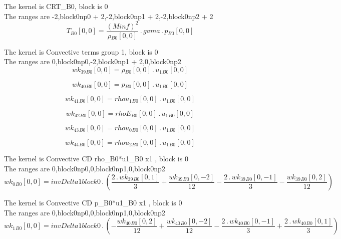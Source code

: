 \documentclass{article}
\begin{document}
\noindent The kernel is CRT_B0, block is 0\\\noindent The ranges are -2,block0np0 + 2,-2,block0np1 + 2,-2,block0np2 + 2\\\begin{dmath}{T{_{B0}}}[{0,0}] = \frac{\left(Minf \right)^{2}}{{\rho{_{B0}}}[{0,0}]} \,.\, gama \,.\, {p{_{B0}}}[{0,0}]\end{dmath}

\noindent The kernel is Convective terms group 1, block is 0\\\noindent The ranges are 0,block0np0,-2,block0np1 + 2,0,block0np2\\\begin{dmath}{wk_{39}{_{B0}}}[{0,0}] = {\rho{_{B0}}}[{0,0}] \,.\, {u_{1}{_{B0}}}[{0,0}]\end{dmath}

\begin{dmath}{wk_{40}{_{B0}}}[{0,0}] = {p{_{B0}}}[{0,0}] \,.\, {u_{1}{_{B0}}}[{0,0}]\end{dmath}

\begin{dmath}{wk_{41}{_{B0}}}[{0,0}] = {rhou_{1}{_{B0}}}[{0,0}] \,.\, {u_{1}{_{B0}}}[{0,0}]\end{dmath}

\begin{dmath}{wk_{42}{_{B0}}}[{0,0}] = {rhoE{_{B0}}}[{0,0}] \,.\, {u_{1}{_{B0}}}[{0,0}]\end{dmath}

\begin{dmath}{wk_{43}{_{B0}}}[{0,0}] = {rhou_{0}{_{B0}}}[{0,0}] \,.\, {u_{1}{_{B0}}}[{0,0}]\end{dmath}

\begin{dmath}{wk_{44}{_{B0}}}[{0,0}] = {rhou_{2}{_{B0}}}[{0,0}] \,.\, {u_{1}{_{B0}}}[{0,0}]\end{dmath}

\noindent The kernel is Convective CD rho_B0*u1_B0 x1 , block is 0\\\noindent The ranges are 0,block0np0,0,block0np1,0,block0np2\\\begin{dmath}{wk_{0}{_{B0}}}[{0,0}] = invDelta1block0 \,.\, \left(\frac{2 \,.\, {wk_{39}{_{B0}}}[{0,1}]}{3} + \frac{{wk_{39}{_{B0}}}[{0,-2}]}{12} - \frac{2 \,.\, {wk_{39}{_{B0}}}[{0,-1}]}{3} - \frac{{wk_{39}{_{B0}}}[{0,2}]}{12}\right)\end{dmath}

\noindent The kernel is Convective CD p_B0*u1_B0 x1 , block is 0\\\noindent The ranges are 0,block0np0,0,block0np1,0,block0np2\\\begin{dmath}{wk_{1}{_{B0}}}[{0,0}] = invDelta1block0 \,.\, \left(- \frac{{wk_{40}{_{B0}}}[{0,2}]}{12} + \frac{{wk_{40}{_{B0}}}[{0,-2}]}{12} - \frac{2 \,.\, {wk_{40}{_{B0}}}[{0,-1}]}{3} + \frac{2 \,.\, {wk_{40}{_{B0}}}[{0,1}]}{3}\right)\end{dmath}
\end{document}
